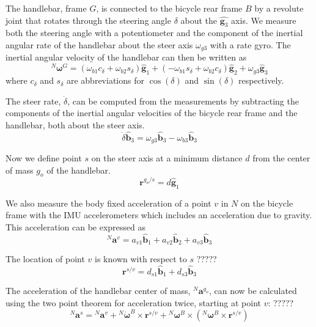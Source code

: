 \documentclass[10pt]{article}
\begin{document}
The handlebar, frame $G$, is connected to the bicycle rear frame $B$ by a
revolute joint that rotates through the steering angle $\delta$ about the
$\hat{\mathbf{g}_3}$ axis. We measure both the steering angle with a
potentiometer and the component of the inertial angular rate of the
handlebar about the steer axis $\omega_{g3}$ with a rate gyro. The inertial angular
velocity of the handlebar can then be written as
%
\begin{equation}
  ^N\boldsymbol{\omega}^G =
    (\omega_{b1}c_\delta + \omega_{b2}s_\delta)\hat{\mathbf{g}}_1 +
    (-\omega_{b1}s_\delta + \omega_{b2}c_\delta)\hat{\mathbf{g}}_2 +
    \omega_{g3}\hat{\mathbf{g}}_3
\end{equation}
%
where $c_\delta$ and $s_\delta$ are abbreviations for $\operatorname{cos}(\delta)$
and $\operatorname{sin}(\delta)$ respectively.

The steer rate, $\dot{\delta}$, can be computed from the measurements by
subtracting the components of the inertial angular velocities of the bicycle rear frame 
and the handlebar, both about the steer axis.
%
\begin{equation}
  \dot{\delta} \hat{\mathbf{b}}_3 = \omega_{g3} \hat{\mathbf{b}}_3 - \omega_{b3} \hat{\mathbf{b}}_3
\end{equation}

Now we define point $s$ on the steer axis at a minimum distance $d$ from the
center of mass $g_o$ of the handlebar.
%
\begin{equation}
  \mathbf{r}^{g_o/s} = d\hat{\mathbf{g}}_1
\end{equation}

We also measure the body fixed acceleration of a point $v$ in $N$ on the
bicycle frame with the IMU accelerometers which includes an acceleration due
to gravity. This acceleration can be expressed as
%
\begin{equation}
  ^N\mathbf{a}^v =
    a_{v1}\hat{\mathbf{b}}_1 +
    a_{v2}\hat{\mathbf{b}}_2 +
    a_{v3}\hat{\mathbf{b}}_3
  \label{eq:acceleration-of-v}
\end{equation}

The location of point $v$ is known with respect to $s$  ?????
%
\begin{equation}
  \mathbf{r}^{s/v} = d_{s1}\hat{\mathbf{b}}_1 + d_{s3}\hat{\mathbf{b}}_3
\end{equation}

The acceleration of the handlebar center of mass, $^N\mathbf{a}^{g_o}$, can
now be calculated using the two point theorem for acceleration \cite{Kane1985}
twice, starting at point $v$:  ?????
%
\begin{equation}
  ^N\mathbf{a}^s = {}^N\mathbf{a}^v +
    {}^N\dot{\boldsymbol{\omega}}^B\times\mathbf{r}^{s/v} +
    {}^N\boldsymbol{\omega}^B\times({}^N\boldsymbol{\omega}^B\times\mathbf{r}^{s/v})
\end{equation}
\end{document}
